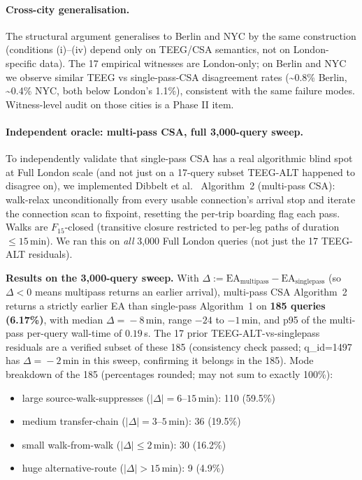\documentclass[letterpaper]{article}
\begin{document}
\paragraph{Cross-city generalisation.} The structural argument
generalises to Berlin and NYC by the same construction (conditions
(i)--(iv) depend only on TEEG/CSA semantics, not on London-specific
data). The 17 empirical witnesses are London-only; on Berlin and NYC
we observe similar TEEG vs single-pass-CSA disagreement rates
(\textasciitilde 0.8\% Berlin, \textasciitilde 0.4\% NYC, both below
London's 1.1\%), consistent with the same failure modes. Witness-level
audit on those cities is a Phase II item.

\paragraph{Independent oracle: multi-pass CSA, full 3{,}000-query sweep.}
To independently validate that single-pass CSA has a real algorithmic
blind spot at Full London scale (and not just on a 17-query subset
TEEG-ALT happened to disagree on), we implemented Dibbelt et al.\
\cite{dibbelt2018csa} Algorithm~2 (multi-pass CSA): walk-relax
unconditionally from every usable connection's arrival stop and
iterate the connection scan to fixpoint, resetting the per-trip
boarding flag each pass. Walks are $F_{15}$-closed (transitive
closure restricted to per-leg paths of duration $\leq 15$\,min).
We ran this on \emph{all} 3{,}000 Full London queries (not just the
17 TEEG-ALT residuals).

\textbf{Results on the 3{,}000-query sweep.} With
$\Delta \!:=\! \text{EA}_\text{multipass}\!-\!\text{EA}_\text{singlepass}$
(so $\Delta\!<\!0$ means multipass returns an earlier arrival),
multi-pass CSA Algorithm~2 returns a strictly earlier EA than
single-pass Algorithm~1 on \textbf{185 queries (6.17\%)}, with
median $\Delta\!=\!-8$\,min, range $-24$ to $-1$\,min, and p95 of
the multi-pass per-query wall-time of $0.19$\,s. The 17 prior
TEEG-ALT-vs-singlepass residuals are a verified subset of these
185 (consistency check passed; q\_id=1497 has $\Delta\!=\!-2$\,min
in this sweep, confirming it belongs in the 185).
Mode breakdown of the 185 (percentages rounded; may not sum to
exactly 100\%):
\begin{itemize}
\item large source-walk-suppresses ($|\Delta|\!=\!6\text{--}15$\,min): 110 (59.5\%)
\item medium transfer-chain ($|\Delta|\!=\!3\text{--}5$\,min): 36 (19.5\%)
\item small walk-from-walk ($|\Delta|\!\leq\!2$\,min): 30 (16.2\%)
\item huge alternative-route ($|\Delta|\!>\!15$\,min): 9 (4.9\%)
\end{itemize}
\end{document}
